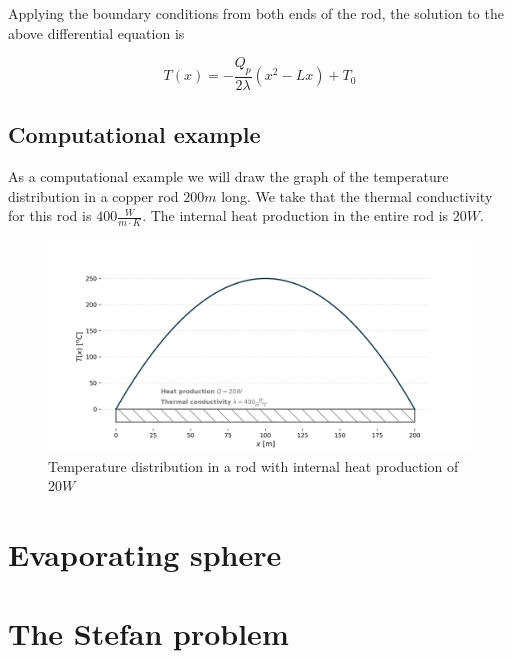 \documentclass[10pt]{article}
\begin{document}
Applying the boundary conditions from both ends of the rod, the solution to the above differential equation is

\begin{equation}
T(x) = - \frac{Q_p}{2 \lambda} (x^2 - Lx) + T_0
\label{eq:solution}
\end{equation}

\newpage

\subsection{Computational example}

As a computational example we will draw the graph of the temperature distribution in a copper rod $200 m$ long. We take that the thermal conductivity for this rod is $400 \frac{W}{m \cdot K}$. The internal heat production in the entire rod is $20 W$.

\begin{figure}[H]
\centering\includegraphics[width=18cm]{temperature_distribution.png}
\caption{Temperature distribution in a rod with internal heat production of $20 W$}
\label{fig:python_graph}
\end{figure}


\newpage

\section{Evaporating sphere}


\newpage

\section{The Stefan problem}
\end{document}
